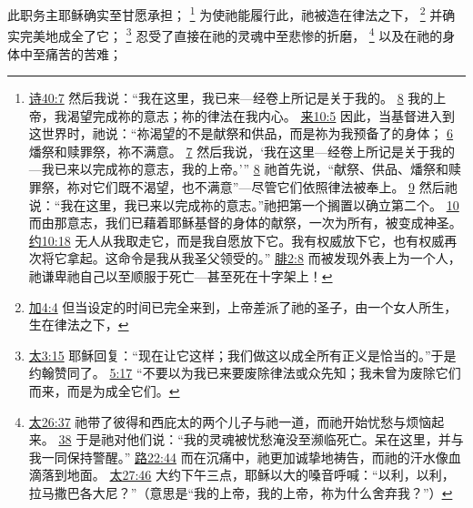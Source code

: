\documentclass[12pt, a4paper, oneside]{ctexart}
\newcounter{parnum}[section]
\newcommand{\N}{%
   \noindent\refstepcounter{parnum}%
    \makebox[\parindent][l]{\textbf{\arabic{parnum}.}}}
\begin{document}
\N 此职务主耶稣确实至甘愿承担；
	\footnote {
		\href{https://biblehub.com/psalms/40-7.htm}{诗40:7} 然后我说：“我在这里，我已来---经卷上所记是关于我的。
		\href{https://biblehub.com/psalms/40-8.htm}{8} 我的上帝，我渴望完成祢的意志；祢的律法在我内心。
		\href{https://biblehub.com/hebrews/10-5.htm}{来10:5} 因此，当基督进入到这世界时，祂说：“祢渴望的不是献祭和供品，而是祢为我预备了的身体；
		\href{https://biblehub.com/hebrews/10-6.htm}{6} 燔祭和赎罪祭，祢不满意。
		\href{https://biblehub.com/hebrews/10-7.htm}{7} 然后我说，‘我在这里---经卷上所记是关于我的---我已来以完成祢的意志，我的上帝。’”
		\href{https://biblehub.com/hebrews/10-8.htm}{8} 祂首先说，“献祭、供品、燔祭和赎罪祭，祢对它们既不渴望，也不满意”---尽管它们依照律法被奉上。
		\href{https://biblehub.com/hebrews/10-9.htm}{9} 然后祂说：“我在这里，我已来以完成祢的意志。”祂把第一个搁置以确立第二个。
		\href{https://biblehub.com/hebrews/10-10.htm}{10} 而由那意志，我们已藉着耶稣基督的身体的献祭，一次为所有，被变成神圣。
		\href{https://biblehub.com/john/10-18.htm}{约10:18} 无人从我取走它，而是我自愿放下它。我有权威放下它，也有权威再次将它拿起。这命令是我从我圣父领受的。”
		\href{https://biblehub.com/philippians/2-8.htm}{腓2:8} 而被发现外表上为一个人，祂谦卑祂自己以至顺服于死亡---甚至死在十字架上！
	}
	为使祂能履行此，祂被造在律法之下，
	\footnote {
		\href{https://biblehub.com/galatians/4-4.htm}{加4:4} 但当设定的时间已完全来到，上帝差派了祂的圣子，由一个女人所生，生在律法之下，
	}
	并确实完美地成全了它；
	\footnote {
		\href{https://biblehub.com/matthew/3-15.htm}{太3:15} 耶稣回复：“现在让它这样；我们做这以成全所有正义是恰当的。”于是约翰赞同了。
		\href{https://biblehub.com/matthew/5-17.htm}{5:17} “不要以为我已来要废除律法或众先知；我未曾为废除它们而来，而是为成全它们。
	}
	忍受了直接在祂的灵魂中至悲惨的折磨，
	\footnote {
		\href{https://biblehub.com/matthew/26-37.htm}{太26:37} 祂带了彼得和西庇太的两个儿子与祂一道，而祂开始忧愁与烦恼起来。
		\href{https://biblehub.com/matthew/26-38.htm}{38} 于是祂对他们说：“我的灵魂被忧愁淹没至濒临死亡。呆在这里，并与我一同保持警醒。”
		\href{https://biblehub.com/luke/22-44.htm}{路22:44} 而在沉痛中，祂更加诚挚地祷告，而祂的汗水像血滴落到地面。
		\href{https://biblehub.com/matthew/27-46.htm}{太27:46} 大约下午三点，耶稣以大的嗓音呼喊：“以利，以利，拉马撒巴各大尼？”（意思是“我的上帝，我的上帝，祢为什么舍弃我？”）
	}
	以及在祂的身体中至痛苦的苦难；
\end{document}

